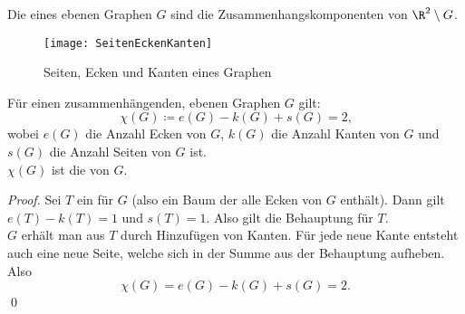 \begin{minipage}{.45\textwidth}
  \begin{definition}[Seiten]
    Die \label{def:seiten} eines ebenen Graphen \( G \) sind die Zusammenhangskomponenten von \( \R^2 \setminus G \).
  \end{definition}
\end{minipage}
\hfill
\begin{minipage}{.45\textwidth}
  \begin{figure}[H]
    \texttt{[image: SeitenEckenKanten]}
    \caption{Seiten, Ecken und Kanten eines Graphen}
  \end{figure}
\end{minipage}

\begin{theorem}
  Für einen zusammenhängenden, ebenen Graphen \( G \) gilt:
  \begin{equation*}
    \chi(G) \coloneqq e(G) - k(G) + s(G) = 2\text{,}
  \end{equation*}
  wobei \( e(G) \) die Anzahl Ecken von \( G \), \( k(G) \) die Anzahl Kanten von \( G \) und \( s(G) \) die Anzahl Seiten von \( G \) ist. \\
  \( \chi(G) \) ist die \label{def:eulercharakteristik} von \( G \).
  \begin{proof}
    Sei \( T \) ein \label{def:aufspannenderBaum} für \( G \) (also ein Baum der alle Ecken von \( G \) enthält). Dann gilt \( e(T)-k(T) = 1 \) und \( s(T) = 1 \). Also gilt die Behauptung für \( T \). \\
    \( G \) erhält man aus \( T \) durch Hinzufügen von Kanten. Für jede neue Kante entsteht auch eine neue Seite, welche sich in der Summe aus der Behauptung aufheben. Also
    \begin{equation*}
      \chi(G) = e(G)-k(G)+s(G) = 2\text{.}
    \end{equation*}\qed{}
  \end{proof}
\end{theorem}

